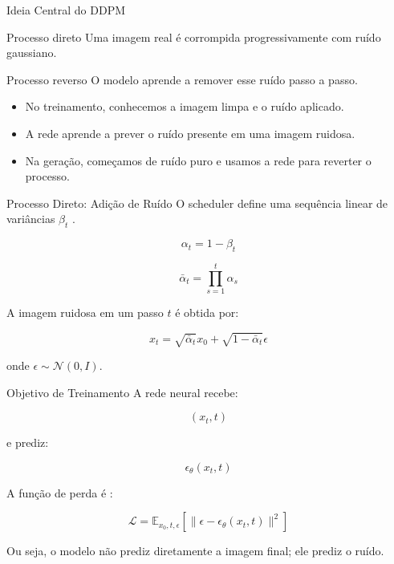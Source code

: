 \documentclass[aspectratio=169]{beamer}
\begin{document}
\begin{frame}{Ideia Central do DDPM}
    \begin{block}{Processo direto}
        Uma imagem real é corrompida progressivamente com ruído gaussiano.
    \end{block}

    \begin{block}{Processo reverso}
        O modelo aprende a remover esse ruído passo a passo.
    \end{block}

    \begin{itemize}
        \item No treinamento, conhecemos a imagem limpa e o ruído aplicado.
        \item A rede aprende a prever o ruído presente em uma imagem ruidosa.
        \item Na geração, começamos de ruído puro e usamos a rede para reverter o processo.
    \end{itemize}
\end{frame}

\begin{frame}{Processo Direto: Adição de Ruído}
    O scheduler define uma sequência linear de variâncias $\beta_t$ \cite{ho2020ddpm}.

    \[
        \alpha_t = 1 - \beta_t
    \]

    \[
        \bar{\alpha}_t = \prod_{s=1}^{t} \alpha_s
    \]

    A imagem ruidosa em um passo $t$ é obtida por:

    \[
        x_t = \sqrt{\bar{\alpha}_t} x_0 + \sqrt{1 - \bar{\alpha}_t} \epsilon
    \]

    onde $\epsilon \sim \mathcal{N}(0, I)$.
\end{frame}

\begin{frame}{Objetivo de Treinamento}
    A rede neural recebe:

    \[
        (x_t, t)
    \]

    e prediz:

    \[
        \epsilon_\theta(x_t, t)
    \]

    A função de perda é \cite{ho2020ddpm}:

    \[
        \mathcal{L} = \mathbb{E}_{x_0, t, \epsilon}\left[\|\epsilon - \epsilon_\theta(x_t, t)\|^2\right]
    \]

    Ou seja, o modelo não prediz diretamente a imagem final; ele prediz o ruído.
\end{frame}
\end{document}

